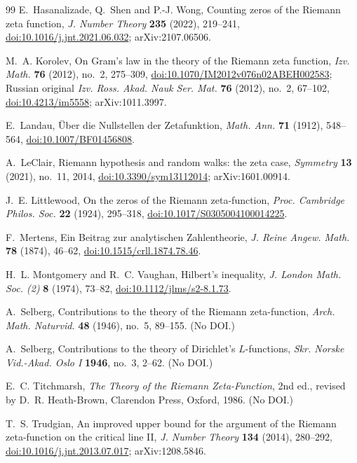 \documentclass[11pt,reqno]{amsart}
\numberwithin{equation}{section}
\theoremstyle{plain}
\theoremstyle{definition}
\theoremstyle{remark}
\begin{document}
\begin{thebibliography}{99}
E.~Hasanalizade, Q.~Shen and P.-J. Wong, Counting zeros of the Riemann zeta function, \emph{J. Number Theory} \textbf{235} (2022), 219--241, \href{https://doi.org/10.1016/j.jnt.2021.06.032}{doi:10.1016/j.jnt.2021.06.032}; arXiv:2107.06506.

M.~A. Korolev, On Gram's law in the theory of the Riemann zeta function, \emph{Izv. Math.} \textbf{76} (2012), no.~2, 275--309, \href{https://doi.org/10.1070/IM2012v076n02ABEH002583}{doi:10.1070/IM2012v076n02ABEH002583}; Russian original \emph{Izv. Ross. Akad. Nauk Ser. Mat.} \textbf{76} (2012), no.~2, 67--102, \href{https://doi.org/10.4213/im5558}{doi:10.4213/im5558}; arXiv:1011.3997.

E.~Landau, \"Uber die Nullstellen der Zetafunktion, \emph{Math. Ann.} \textbf{71} (1912), 548--564, \href{https://doi.org/10.1007/BF01456808}{doi:10.1007/BF01456808}.

A.~LeClair, Riemann hypothesis and random walks: the zeta case, \emph{Symmetry} \textbf{13} (2021), no.~11, 2014, \href{https://doi.org/10.3390/sym13112014}{doi:10.3390/sym13112014}; arXiv:1601.00914.

J.~E. Littlewood, On the zeros of the Riemann zeta-function, \emph{Proc. Cambridge Philos. Soc.} \textbf{22} (1924), 295--318, \href{https://doi.org/10.1017/S0305004100014225}{doi:10.1017/S0305004100014225}.

F.~Mertens, Ein Beitrag zur analytischen Zahlentheorie, \emph{J. Reine Angew. Math.} \textbf{78} (1874), 46--62, \href{https://doi.org/10.1515/crll.1874.78.46}{doi:10.1515/crll.1874.78.46}.

H.~L. Montgomery and R.~C. Vaughan, Hilbert's inequality, \emph{J. London Math. Soc. (2)} \textbf{8} (1974), 73--82, \href{https://doi.org/10.1112/jlms/s2-8.1.73}{doi:10.1112/jlms/s2-8.1.73}.

A.~Selberg, Contributions to the theory of the Riemann zeta-function, \emph{Arch. Math. Naturvid.} \textbf{48} (1946), no.~5, 89--155. (No DOI.)

A.~Selberg, Contributions to the theory of Dirichlet's $L$-functions, \emph{Skr. Norske Vid.-Akad. Oslo I} \textbf{1946}, no.~3, 2--62. (No DOI.)

E.~C. Titchmarsh, \emph{The Theory of the Riemann Zeta-Function}, 2nd ed., revised by D.~R. Heath-Brown, Clarendon Press, Oxford, 1986. (No DOI.)

T.~S. Trudgian, An improved upper bound for the argument of the Riemann zeta-function on the critical line II, \emph{J. Number Theory} \textbf{134} (2014), 280--292, \href{https://doi.org/10.1016/j.jnt.2013.07.017}{doi:10.1016/j.jnt.2013.07.017}; arXiv:1208.5846.

\end{thebibliography}
\end{document}
